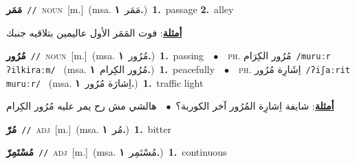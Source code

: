 \documentclass[10pt,a4paper,twoside]{article} %
\begin{document}
\begin{multicols}{2}
{\setlength\topsep{0pt}\textbf{\foreignlanguage{arabic}{مَمَر}}\ {\color{gray}\texttt{//}\color{black}}\ \textsc{noun}\ [m.]\ \color{gray}(msa. \foreignlanguage{arabic}{مَمَر}~\foreignlanguage{arabic}{\textbf{١.}})\color{black}\ \textbf{1.}~passage  \textbf{2.}~alley\  \begin{flushright}\color{gray}\foreignlanguage{arabic}{\textbf{\underline{\foreignlanguage{arabic}{أمثلة}}}: فوت المَمَر الأول عاليمين بتلاقيه جنبك}\end{flushright}\color{black}} \vspace{2mm}

{\setlength\topsep{0pt}\textbf{\foreignlanguage{arabic}{مُرُور}}\ {\color{gray}\texttt{//}\color{black}}\ \textsc{noun}\ [m.]\ \color{gray}(msa. \foreignlanguage{arabic}{مُرُور}~\foreignlanguage{arabic}{\textbf{١.}})\color{black}\ \textbf{1.}~passing\ \ $\bullet$\ \ \textsc{ph.} \color{gray} \foreignlanguage{arabic}{مُرُور الكِرَام}\color{black}\ {\color{gray}\texttt{/{\sffamily muruːr ʔilkiraːm}/}\color{black}}\ \color{gray} (msa. \foreignlanguage{arabic}{مُرُور الكِرام}~\foreignlanguage{arabic}{\textbf{١.}})\color{black}\ \textbf{1.}~peacefully\ \ $\bullet$\ \ \textsc{ph.} \color{gray} \foreignlanguage{arabic}{اِشَارِة مُرُور}\color{black}\ {\color{gray}\texttt{/{\sffamily ʔiʃaːrit muruːr}/}\color{black}}\ \color{gray} (msa. \foreignlanguage{arabic}{اِشارَة مُرُور}~\foreignlanguage{arabic}{\textbf{١.}})\color{black}\ \textbf{1.}~traffic light\  \begin{flushright}\color{gray}\foreignlanguage{arabic}{\textbf{\underline{\foreignlanguage{arabic}{أمثلة}}}: شايفة اِشارِة المُرُور آخر الكوربة؟\ $\bullet$\ \  هالشي مش رح يمر عليه مُرُور الكِرام}\end{flushright}\color{black}} \vspace{2mm}

{\setlength\topsep{0pt}\textbf{\foreignlanguage{arabic}{مُرّ}}\ {\color{gray}\texttt{//}\color{black}}\ \textsc{adj}\ [m.]\ \color{gray}(msa. \foreignlanguage{arabic}{مُر}~\foreignlanguage{arabic}{\textbf{١.}})\color{black}\ \textbf{1.}~bitter\ } \vspace{2mm}

{\setlength\topsep{0pt}\textbf{\foreignlanguage{arabic}{مُسْتَمِرّ}}\ {\color{gray}\texttt{//}\color{black}}\ \textsc{adj}\ [m.]\ \color{gray}(msa. \foreignlanguage{arabic}{مُسْتَمِر}~\foreignlanguage{arabic}{\textbf{١.}})\color{black}\ \textbf{1.}~continuous\ } \vspace{2mm}


\end{multicols}
\end{document}
